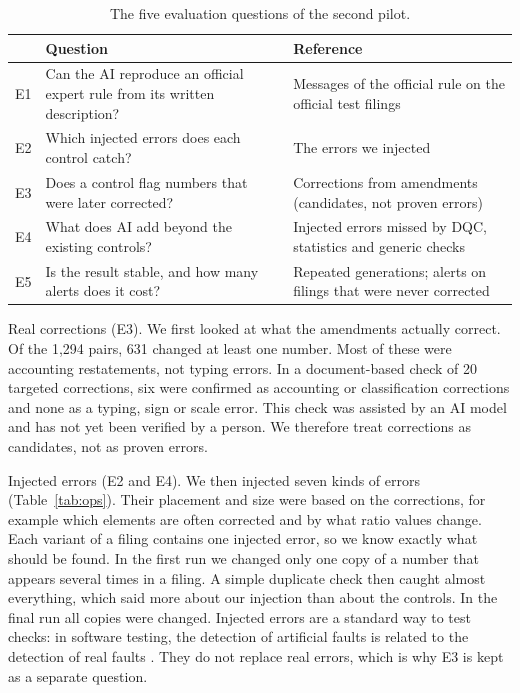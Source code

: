 \documentclass[11pt,a4paper]{article}
\begin{document}
\begin{table}[htbp]
\centering
\small
\begin{tabularx}{\textwidth}{@{}p{0.7cm}LL@{}}
\toprule
 & Question & Reference \\
\midrule
E1 & Can the AI reproduce an official expert rule from its written description? & Messages of the official rule on the official test filings \\
E2 & Which injected errors does each control catch? & The errors we injected \\
E3 & Does a control flag numbers that were later corrected? & Corrections from amendments (candidates, not proven errors) \\
E4 & What does AI add beyond the existing controls? & Injected errors missed by DQC, statistics and generic checks \\
E5 & Is the result stable, and how many alerts does it cost? & Repeated generations; alerts on filings that were never corrected \\
\bottomrule
\end{tabularx}
\caption{The five evaluation questions of the second pilot.}
\label{tab:e}
\end{table}

Real corrections (E3). We first looked at what the amendments actually correct. Of the 1{,}294 pairs, 631 changed at least one number. Most of these were accounting restatements, not typing errors. In a document-based check of 20 targeted corrections, six were confirmed as accounting or classification corrections and none as a typing, sign or scale error. This check was assisted by an AI model and has not yet been verified by a person. We therefore treat corrections as candidates, not as proven errors.

Injected errors (E2 and E4). We then injected seven kinds of errors (Table~\ref{tab:ops}). Their placement and size were based on the corrections, for example which elements are often corrected and by what ratio values change. Each variant of a filing contains one injected error, so we know exactly what should be found. In the first run we changed only one copy of a number that appears several times in a filing. A simple duplicate check then caught almost everything, which said more about our injection than about the controls. In the final run all copies were changed. Injected errors are a standard way to test checks: in software testing, the detection of artificial faults is related to the detection of real faults \cite{just}. They do not replace real errors, which is why E3 is kept as a separate question.
\end{document}

